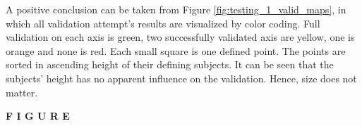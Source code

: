 A positive conclusion can be taken from Figure \ref{fig:testing_1_valid_maps}, in which all validation attempt's results are visualized by color coding. Full validation on each axis is green, two successfully validated axis are yellow, one is orange and none is red. Each small square is one defined point. The points are sorted in ascending height of their defining subjects. It can be seen that the subjects' height has no apparent influence on the validation. Hence, size does not matter.

\textbf{F I G U R E}

